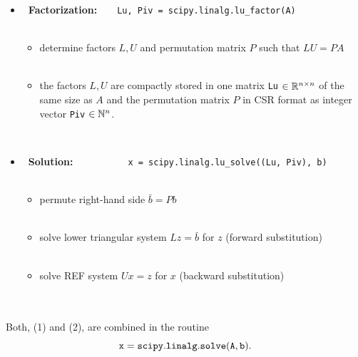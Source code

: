\begin{frame}
	\begin{itemize}
		\item[{\bf~(1)}] {\bf~Factorization:}~~~~{\tt Lu, Piv = scipy.linalg.lu\_factor(A)}~\\~\\
		\begin{itemize} \normalsize
			\item determine factors $L,U$ and permutation matrix $P$ such that $LU=PA$\\~\\
			\item the factors $L,U$ are compactly stored in one matrix {\tt Lu} $\in{\mathbb{R}}^{n\times n}$ of the same size as $A$ and the permutation matrix $P$ in CSR format as integer vector {\tt Piv} $\in{\mathbb{N}}^{n}$.
		\end{itemize} ~\\
		\vspace{0.8cm}
		\item[{\bf~(2)}] {\bf~Solution:}~~~~~~~~~~~{\tt x = scipy.linalg.lu\_solve((Lu, Piv), b)}~\\~\\
		\begin{itemize}
			\normalsize
			\item[\color{cyan}(2.1)] permute right-hand side $\bar{b}=Pb$~\\~\\
			\item[\color{cyan}(2.2)] solve lower triangular system $Lz=\bar{b}$ for $z$ (forward substitution)~\\~\\
			\item[\color{cyan}(2.3)] solve REF system $Ux=z$ for $x$  (backward substitution)
		\end{itemize}
	\end{itemize}
	~\\
	~\\
	Both, (1) and (2), are combined in the routine $${\tt x = scipy.linalg.solve(A,b)}.$$ 
\end{frame}



